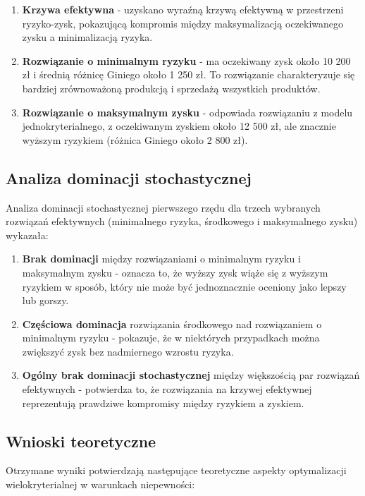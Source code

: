\documentclass[12pt]{article}
\begin{document}
\begin{enumerate}
  \item \textbf{Krzywa efektywna} - uzyskano wyraźną krzywą efektywną w przestrzeni ryzyko-zysk, pokazującą kompromis między maksymalizacją oczekiwanego zysku a minimalizacją ryzyka.
  \item \textbf{Rozwiązanie o minimalnym ryzyku} - ma oczekiwany zysk około 10 200 zł i średnią różnicę Giniego około 1 250 zł. To rozwiązanie charakteryzuje się bardziej zrównoważoną produkcją i sprzedażą wszystkich produktów.
  \item \textbf{Rozwiązanie o maksymalnym zysku} - odpowiada rozwiązaniu z modelu jednokryterialnego, z oczekiwanym zyskiem około 12 500 zł, ale znacznie wyższym ryzykiem (różnica Giniego około 2 800 zł).
\end{enumerate}

\subsection{Analiza dominacji stochastycznej}

Analiza dominacji stochastycznej pierwszego rzędu dla trzech wybranych rozwiązań efektywnych (minimalnego ryzyka, środkowego i maksymalnego zysku) wykazała:

\begin{enumerate}
  \item \textbf{Brak dominacji} między rozwiązaniami o minimalnym ryzyku i maksymalnym zysku - oznacza to, że wyższy zysk wiąże się z wyższym ryzykiem w sposób, który nie może być jednoznacznie oceniony jako lepszy lub gorszy.
  \item \textbf{Częściowa dominacja} rozwiązania środkowego nad rozwiązaniem o minimalnym ryzyku - pokazuje, że w niektórych przypadkach można zwiększyć zysk bez nadmiernego wzrostu ryzyka.
  \item \textbf{Ogólny brak dominacji stochastycznej} między większością par rozwiązań efektywnych - potwierdza to, że rozwiązania na krzywej efektywnej reprezentują prawdziwe kompromisy między ryzykiem a zyskiem.
\end{enumerate}

\subsection{Wnioski teoretyczne}

Otrzymane wyniki potwierdzają następujące teoretyczne aspekty optymalizacji wielokryterialnej w warunkach niepewności:
\end{document}
